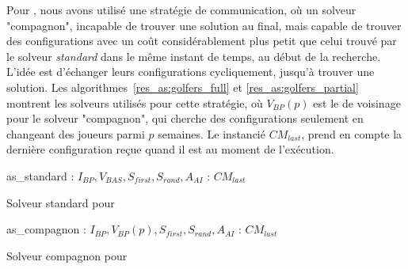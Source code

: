 Pour \SGP{}, nous avons utilisé une stratégie de communication, où un solveur "compagnon", incapable de trouver une solution au final, mais capable de trouver des configurations avec un coût considérablement plus petit que celui trouvé par le solveur \textit{standard} dans le même instant de temps, au début de la recherche. L'idée est d'échanger leurs configurations cycliquement, jusqu'à trouver une solution. Les algorithmes~\ref{res_as:golfers_full} et \ref{res_as:golfers_partial} montrent les solveurs utilisés pour cette stratégie, où $V_{BP}(p)$ est le \om{} de voisinage pour le solveur "compagnon", qui cherche des configurations seulement en changeant des joueurs parmi $p$ semaines. Le \opch{} instancié $CM_{last}$, prend en compte la dernière configuration reçue quand il est au moment de l'exécution.

\begin{algorithm}
\dontprintsemicolon
\SetNoline
{}
   as\_standard\;
\algoindent {} : $I_{BP}, V_{BAS}, S_{first}, S_{rand}, A_{AI}$ \;
\algoindent {} : $CM_{last}$ \;
\caption{Solveur standard pour \SGP}\label{res_as:golfers_full}
\end{algorithm}

\begin{algorithm}
\dontprintsemicolon
\SetNoline
{}
   as\_compagnon\;
\algoindent {} : $I_{BP}, V_{BP}(p), S_{first}, S_{rand}, A_{AI}$ \;
\algoindent {} : $CM_{last}$ \;
\caption{Solveur compagnon pour \SGP}\label{res_as:golfers_partial}
\end{algorithm}

